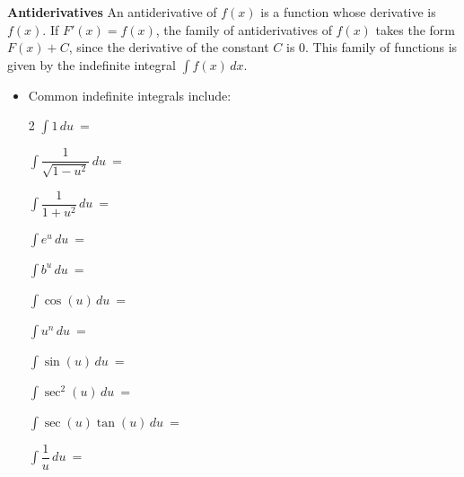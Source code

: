 \documentclass{article}
\begin{document}
  \begin{framed}
  \vspace{0.05in}
\textbf{Antiderivatives} An antiderivative of $f(x)$ is a function whose derivative is $f(x)$. If $F'(x)=f(x)$, the family of antiderivatives of $f(x)$ takes the form $F(x)+C$, since the derivative of the constant $C$ is $0$. This family of functions is given by the indefinite integral $\displaystyle \int f(x)\,dx$. 
    \vfill
    \begin{itemize}
    \item Common indefinite integrals include:

\begin{multicols}{2}
 $\displaystyle \int 1\,du\ =$
 \solonly{\textcolor{red}{$u+C$}}
 \newline
 
$\displaystyle \int \dfrac{1}{\sqrt{1-u^2}}\,du\ =$
\solonly{\textcolor{red}{$\arcsin u+C$}}
\newline
 
$\displaystyle \int \dfrac{1}{1+u^2}\,du\ =$
\solonly{\textcolor{red}{$\arctan u+C$}}
\newline

 $\displaystyle \int e^u\,du\ =$
 \solonly{\textcolor{red}{$e^u+C$}}
 \newline 
 
 $\displaystyle \int b^u\,du\ =$
\newline

$\displaystyle \int \cos(u)\,du\ =$
\solonly{\textcolor{red}{$\sin u+C$}}
\newline

$\displaystyle \int u^n\,du\ =$
\newline

$\displaystyle \int \sin(u)\,du\ =$
\solonly{\textcolor{red}{$-\cos u +C$}}
\newline

$\displaystyle \int \sec^2(u)\,du\ =$
\solonly{\textcolor{red}{$\tan u +C$}}
\newline

$\displaystyle \int \sec(u) \tan(u)\,du\ =$
\solonly{\textcolor{red}{$\sec u +C$}}
\newline 

$\displaystyle \int \dfrac{1}{u}\,du\ =$
\solonly{\textcolor{red}{$\ln |u| +C$}}
\newline
\newline
\newline

\end{multicols}

\end{itemize}
\end{framed}
\end{document}
